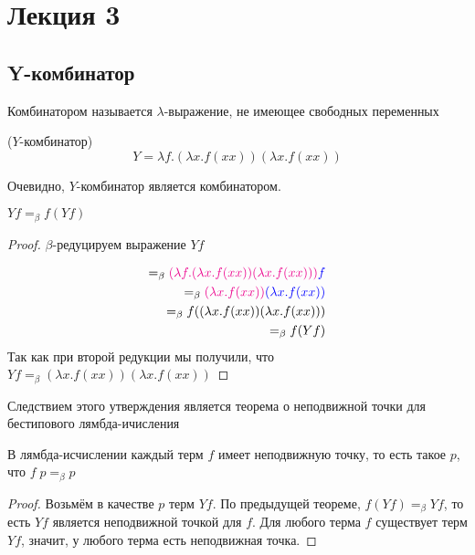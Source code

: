 \section{Лекция 3}

\subsection{Y-комбинатор}

\begin{definition}
	Комбинатором называется $\lambda$-выражение, не имеющее свободных переменных
\end{definition}

\begin{definition}($Y$-комбинатор)
	\[
	Y = \lambda f . (\lambda x . f (x x)) (\lambda x . f (x x))
	\]
\end{definition}

Очевидно, $Y$-комбинатор является комбинатором.

\begin{theorem}
	$Y f =_{\beta} f (Y f)$
	
	\begin{proof}
		$\beta$-редуцируем выражение $Y f$
		
		\begin{align*}
			 =_{\beta} \textcolor{magenta}{(\lambda f . (\lambda x . f (x x)) (\lambda x . f (x x)))}\textcolor{blue}{f} \\ =_{\beta} \textcolor{magenta}{(\lambda x . f (x x))} \textcolor{blue}{(\lambda x . f (x x))} \\ =_{\beta} f ((\lambda x . f (x x))(\lambda x . f (x x))) \\ =_{\beta} f(Y f)
		\end{align*}
		Так как при второй редукции мы получили, что $Y f =_{\beta} (\lambda x . f (x x))(\lambda x . f (x x))$
	\end{proof}	
\end{theorem}

Следствием этого утверждения является теорема о неподвижной точки для бестипового лямбда-ичисления

\begin{theorem}
	В лямбда-исчислении каждый терм $f$ имеет неподвижную точку, то есть такое $p$, что $f \; p =_{\beta} p$
	
	\begin{proof}
		Возьмём в качестве $p$ терм $Y f$. По предыдущей теореме, $f(Y f) =_{\beta} Y f$, то есть $Y f$ является неподвижной точкой для $f$. Для любого терма $f$ существует терм $Y f$, значит, у любого терма есть неподвижная точка.
	\end{proof}
\end{theorem}


